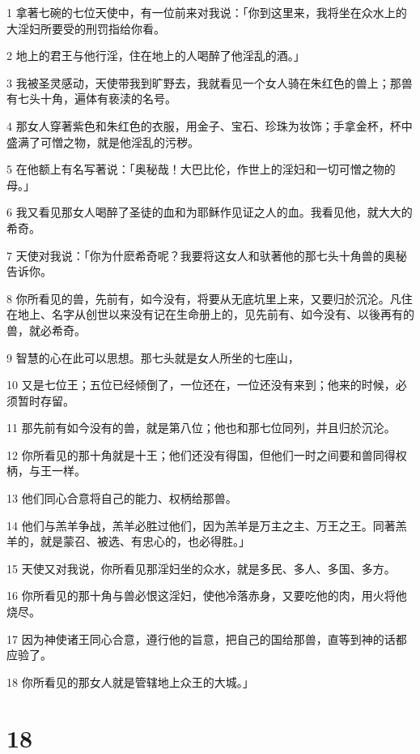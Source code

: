 \par 1 拿著七碗的七位天使中，有一位前来对我说：「你到这里来，我将坐在众水上的大淫妇所要受的刑罚指给你看。
\par 2 地上的君王与他行淫，住在地上的人喝醉了他淫乱的酒。」
\par 3 我被圣灵感动，天使带我到旷野去，我就看见一个女人骑在朱红色的兽上；那兽有七头十角，遍体有亵渎的名号。
\par 4 那女人穿著紫色和朱红色的衣服，用金子、宝石、珍珠为妆饰；手拿金杯，杯中盛满了可憎之物，就是他淫乱的污秽。
\par 5 在他额上有名写著说：「奥秘哉！大巴比伦，作世上的淫妇和一切可憎之物的母。」
\par 6 我又看见那女人喝醉了圣徒的血和为耶稣作见证之人的血。我看见他，就大大的希奇。
\par 7 天使对我说：「你为什麽希奇呢？我要将这女人和驮著他的那七头十角兽的奥秘告诉你。
\par 8 你所看见的兽，先前有，如今没有，将要从无底坑里上来，又要归於沉沦。凡住在地上、名字从创世以来没有记在生命册上的，见先前有、如今没有、以後再有的兽，就必希奇。
\par 9 智慧的心在此可以思想。那七头就是女人所坐的七座山，
\par 10 又是七位王；五位已经倾倒了，一位还在，一位还没有来到；他来的时候，必须暂时存留。
\par 11 那先前有如今没有的兽，就是第八位；他也和那七位同列，并且归於沉沦。
\par 12 你所看见的那十角就是十王；他们还没有得国，但他们一时之间要和兽同得权柄，与王一样。
\par 13 他们同心合意将自己的能力、权柄给那兽。
\par 14 他们与羔羊争战，羔羊必胜过他们，因为羔羊是万主之主、万王之王。同著羔羊的，就是蒙召、被选、有忠心的，也必得胜。」
\par 15 天使又对我说，你所看见那淫妇坐的众水，就是多民、多人、多国、多方。
\par 16 你所看见的那十角与兽必恨这淫妇，使他冷落赤身，又要吃他的肉，用火将他烧尽。
\par 17 因为神使诸王同心合意，遵行他的旨意，把自己的国给那兽，直等到神的话都应验了。
\par 18 你所看见的那女人就是管辖地上众王的大城。」

\chapter{18}

